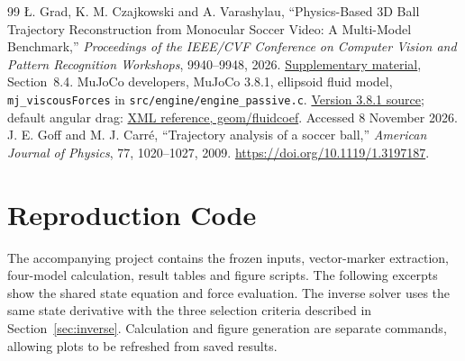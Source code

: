 \documentclass[12pt,letterpaper]{article}
\begin{document}
\begin{thebibliography}{99}
 \L{}. Grad, K. M. Czajkowski and A. Varashylau, ``Physics-Based 3D Ball Trajectory Reconstruction from Monocular Soccer Video: A Multi-Model Benchmark,'' \emph{Proceedings of the IEEE/CVF Conference on Computer Vision and Pattern Recognition Workshops}, 9940--9948, 2026. \href{https://openaccess.thecvf.com/content/CVPR2026W/CVsports/supplemental/Grad_Physics-Based_3D_Ball_CVPRW_2026_supplemental.pdf}{Supplementary material}, Section~8.4.
 MuJoCo developers, MuJoCo 3.8.1, ellipsoid fluid model, \texttt{mj\_viscousForces} in \texttt{src/engine/engine\_passive.c}. \href{https://github.com/google-deepmind/mujoco/blob/3.8.1/src/engine/engine_passive.c}{Version 3.8.1 source}; default angular drag: \href{https://mujoco.readthedocs.io/en/stable/XMLreference.html#body-geom-fluidcoef}{XML reference, geom/fluidcoef}. Accessed 8 November 2026.
 J. E. Goff and M. J. Carr\'e, ``Trajectory analysis of a soccer ball,'' \emph{American Journal of Physics}, 77, 1020--1027, 2009. \url{https://doi.org/10.1119/1.3197187}.
\end{thebibliography}

\newpage{}
\section*{Reproduction Code}
The accompanying project contains the frozen inputs, vector-marker extraction, four-model calculation, result tables and figure scripts. The following excerpts show the shared state equation and force evaluation. The inverse solver uses the same state derivative with the three selection criteria described in Section~\ref{sec:inverse}. Calculation and figure generation are separate commands, allowing plots to be refreshed from saved results.


\end{document}
